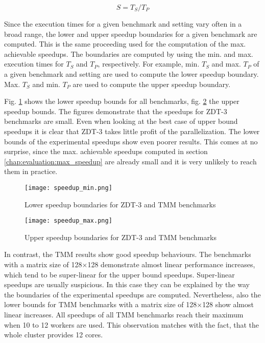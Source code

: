 \begin{equation}
S = T_S / T_P
\end{equation}

Since the execution times for a given benchmark and setting vary often in a broad range, the lower and upper speedup boundaries for a given benchmark are computed. This is the same proceeding used for the computation of the max. achievable speedups. The boundaries are computed by using the min. and max. execution times for $T_S$ and $T_P$, respectively. For example, min. $T_S$ and max. $T_P$ of a given benchmark and setting are used to compute the lower speedup boundary. Max. $T_S$ and min. $T_P$ are used to compute the upper speedup boundary.

Fig. \ref{fig:speedup_min} shows the lower speedup bounds for all benchmarks, fig. \ref{fig:speedup_max} the upper speedup bounds. The figures demonstrate that the speedups for ZDT-3 benchmarks are small. Even when looking at the best case of upper bound speedups it is clear that ZDT-3 takes little profit of the parallelization. The lower bounds of the experimental speedups show even poorer results. This comes at no surprise, since the max. achievable speedups computed in section \ref{chap:evaluation:max_speedup} are already small and it is very unlikely to reach them in practice.

\begin{figure}
  \centering
  \texttt{[image: speedup\_min.png]}
  \caption[Min. speedups for ZDT-3 and TMM benchmarks]{Lower speedup boundaries for ZDT-3 and TMM benchmarks}
  \label{fig:speedup_min}
\end{figure}
\begin{figure}
  \centering
  \texttt{[image: speedup\_max.png]}
  \caption[Max. speedups for ZDT-3 and TMM benchmarks]{Upper speedup boundaries for ZDT-3 and TMM benchmarks}
  \label{fig:speedup_max}
\end{figure}

In contrast, the TMM results show good speedup behaviours. The benchmarks with a matrix size of 128$\times$128 demonstrate almost linear performance increases, which tend to be super-linear for the upper bound speedups. Super-linear speedups are usually suspicious. In this case they can be explained by the way the boundaries of the experimental speedups are computed. Nevertheless, also the lower bounds for TMM benchmarks with a matrix size of 128$\times$128 show almost linear increases. All speedups of all TMM benchmarks reach their maximum when 10 to 12 workers are used. This observation matches with the fact, that the whole cluster provides 12 cores.

